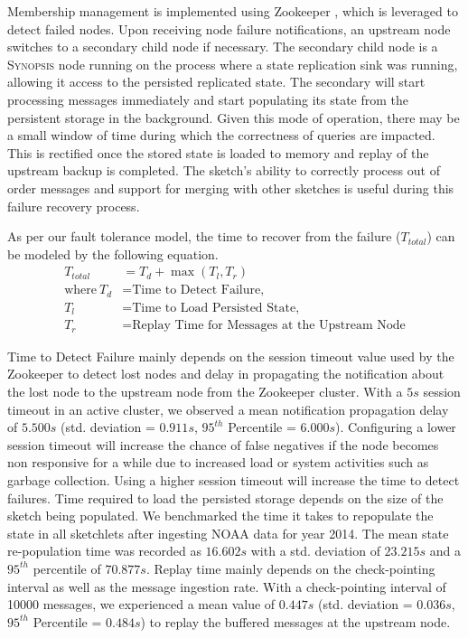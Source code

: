Membership management is implemented using Zookeeper \cite{hunt2010zookeeper}, which is leveraged to detect failed nodes.
Upon receiving node failure notifications, an upstream node switches to a secondary child node if necessary. The secondary child node is a \textsc{Synopsis} node running on the process where a state replication sink was running, allowing it access to the persisted replicated state.
The secondary will start processing messages immediately and start populating its state from the persistent storage in the background.
Given this mode of operation, there may be a small window of time during which the correctness of queries are impacted.
This is rectified once the stored state is loaded to memory and replay of the upstream backup is completed.
The sketch's ability to correctly process out of order messages and support for merging with other sketches is useful during this failure recovery process.

As per our fault tolerance model, the time to recover from the failure ($T_{total}$) can be modeled by the following equation.
\begin{align*}
    T_{total} &= T_{d} + \max{(T_{l}, T_{r})} \\      \text{where}~T_{d} &= \text{Time to Detect Failure,} \\      T_{l} &= \text{Time to Load Persisted State,}\\      T_{r} &= \text{Replay Time for Messages at the Upstream Node}
\end{align*}

Time to Detect Failure mainly depends on the session timeout value used by the Zookeeper to detect lost nodes and delay in propagating the notification about the lost node to the upstream node from the Zookeeper cluster. With a $5s$ session timeout in an active cluster, we observed a mean notification propagation delay of $5.500s$ (std. deviation = $0.911s$, $95^{th}$ Percentile = $6.000s$). Configuring a lower session timeout will increase the chance of false negatives if the node becomes non responsive for a while due to increased load or system activities such as garbage collection. Using a higher session timeout will increase the time to detect failures. Time required to load the persisted storage depends on the size of the sketch being populated. We benchmarked the time it takes to repopulate the state in all sketchlets after ingesting NOAA data for year 2014. The mean state re-population time was recorded as $16.602s$ with a std. deviation of $23.215s$ and a $95^{th}$ percentile of $70.877s$. Replay time mainly depends on the check-pointing interval as well as the message ingestion rate. With a check-pointing interval of 10000 messages, we experienced a mean value of $0.447s$ (std. deviation = $0.036s$, $95^{th}$ Percentile = $0.484s$) to replay the buffered messages at the upstream node.  														


